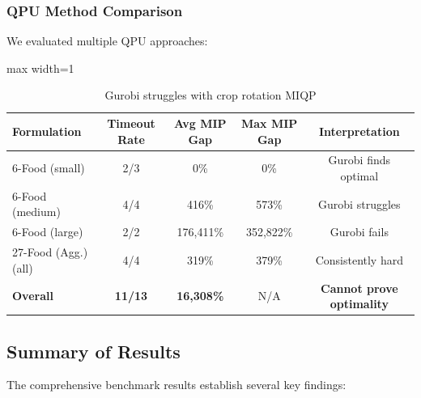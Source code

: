 \subsubsection{QPU Method Comparison}

We evaluated multiple QPU approaches:


\begin{table}[H]
\centering
\caption{Gurobi struggles with crop rotation MIQP}
\label{tab:gurobi_struggles}
\begin{adjustbox}{max width=1\textwidth}
\small
\begin{tabular}{lcccc}
\toprule
\textbf{Formulation} & \textbf{Timeout Rate} & \textbf{Avg MIP Gap} & \textbf{Max MIP Gap} & \textbf{Interpretation} \\
\midrule
6-Food (small) & 2/3 & 0\% & 0\% & Gurobi finds optimal \\
6-Food (medium) & 4/4 & 416\% & 573\% & Gurobi struggles \\
6-Food (large) & 2/2 & 176,411\% & 352,822\% & Gurobi fails \\
27-Food (Agg.) (all) & 4/4 & 319\% & 379\% & Consistently hard \\
\midrule
\textbf{Overall} & \textbf{11/13} & \textbf{16,308\%} & N/A & \textbf{Cannot prove optimality} \\
\bottomrule
\end{tabular}
\end{adjustbox}
\end{table}



\subsection{Summary of Results}

The comprehensive benchmark results establish several key findings:

